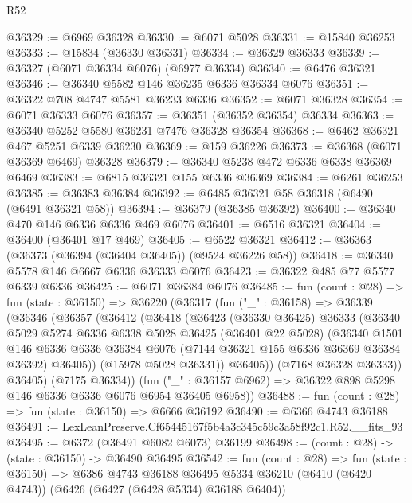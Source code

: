 \begin{lexlean}{R52}
\begin{coremodule}
@36329 := @6969 @36328
@36330 := @6071 @5028
@36331 := @15840 @36253
@36333 := @15834 (@36330 @36331)
@36334 := @36329 @36333
@36339 := @36327 (@6071 @36334 @6076) (@6977 @36334)
@36340 := @6476 @36321
@36346 := @36340 @5582 @146 @36235 @6336 @36334 @6076
@36351 := @36322 @708 @4747 @5581 @36233 @6336
@36352 := @6071 @36328
@36354 := @6071 @36333 @6076
@36357 := @36351 (@36352 @36354) @36334
@36363 := @36340 @5252 @5580 @36231 @7476 @36328 @36354
@36368 := @6462 @36321 @467 @5251 @6339 @36230
@36369 := @159 @36226
@36373 := @36368 (@6071 @36369 @6469) @36328
@36379 := @36340 @5238 @472 @6336 @6338 @36369 @6469
@36383 := @6815 @36321 @155 @6336 @36369
@36384 := @6261 @36253
@36385 := @36383 @36384
@36392 := @6485 @36321 @58 @36318 (@6490 (@6491 @36321 @58))
@36394 := @36379 (@36385 @36392)
@36400 := @36340 @470 @146 @6336 @6336 @469 @6076
@36401 := @6516 @36321
@36404 := @36400 (@36401 @17 @469)
@36405 := @6522 @36321
@36412 := @36363 (@36373 (@36394 (@36404 @36405)) (@9524 @36226 @58))
@36418 := @36340 @5578 @146 @6667 @6336 @36333 @6076
@36423 := @36322 @485 @77 @5577 @6339 @6336
@36425 := @6071 @36384 @6076
@36485 := fun (count : @28) =>
  fun (state : @36150) =>
  @36220
    (@36317
      (fun ("_" : @36158) =>
      @36339
        (@36346
          (@36357
            (@36412
              (@36418
                (@36423
                  (@36330 @36425)
                  @36333
                  (@36340
                    @5029
                    @5274
                    @6336
                    @6338
                    @5028
                    @36425
                    (@36401 @22 @5028)
                    (@36340
                      @1501
                      @146
                      @6336
                      @6336
                      @36384
                      @6076
                      (@7144 @36321 @155 @6336 @36369 @36384 @36392)
                      @36405))
                  (@15978 @5028 @36331))
                @36405))
            (@7168 @36328 @36333))
          @36405)
        (@7175 @36334))
      (fun ("_" : @36157 @6962) => @36322 @898 @5298 @146 @6336 @6336 @6076 @6954 @36405 @6958))
@36488 := fun (count : @28) => fun (state : @36150) => @6666 @36192
@36490 := @6366 @4743 @36188
@36491 := LexLeanPreserve.Cf65445167f5b4a3c345c59c3a58f92c1.R52.__fits_93
@36495 := @6372 (@36491 @6082 @6073) @36199
@36498 := (count : @28) -> (state : @36150) -> @36490 @36495
@36542 := fun (count : @28) =>
  fun (state : @36150) =>
  @6386
    @4743
    @36188
    @36495
    @5334
    @36210
    (@6410 (@6420 @4743))
    (@6426 (@6427 (@6428 @5334) @36188 @6404))

\end{coremodule}
\end{lexlean}
